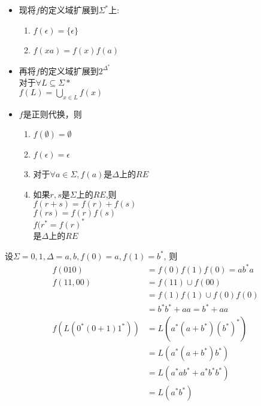 \begin{itemize}
	\item 现将$f$的定义域扩展到$\Sigma^{\ast}$上:
	\begin{enumerate}
		\item $f(\epsilon) =\{\epsilon\}$
		\item $f(xa)=f(x)f(a)$
	\end{enumerate}
	\item 再将$f$的定义域扩展到$2^{\Delta^{\ast}}$\\
	对于$\forall L\subseteq \Sigma{\ast}$\\
	$f(L) = \bigcup\limits_{x\in L} f(x)$
	\item $f$是正则代换，则
	\begin{enumerate}
		\item $f(\emptyset)=\emptyset$
		\item $f(\epsilon)=\epsilon$
		\item 对于$\forall a\in \Sigma,f(a)$是$\Delta$上的$RE$
		\item 如果$r,s$是$\Sigma$上的$RE$,则\\
		$f(r+s)=f(r)+f(s)$\\
		$f(rs)=f(r)f(s)$\\
		$f(r^{\ast}={f(r)}^{\ast}$\\
		是$\Delta$上的$RE$
	\end{enumerate}
\end{itemize}

\begin{example}
	设$\Sigma={0,1},\Delta={a,b},f(0)=a,f(1)=b^{\ast}$, 则
	\begin{align*}
	f(010) &= f(0)f(1)f(0)=ab^{\ast}a\\
	f({11,00})&=f(11)\cup f(00) \\
	&=f(1)f(1)\cup f(0)f(0)\\
	&=b^{\ast}b^{\ast}+aa = b^{\ast}+aa \\
	f(L(0^{\ast}(0+1)1^{\ast})) &= L(a^{\ast}(a+b^{\ast}){(b^{\ast})}^{\ast})\\
	&= L(a^{\ast}(a+b^{\ast})b^{\ast})\\
	&= L(a^{\ast}ab^{\ast} + a^{\ast}b^{\ast}b^{\ast})\\
	&= L(a^{\ast}b^{\ast})
	\end{align*}
\end{example}

